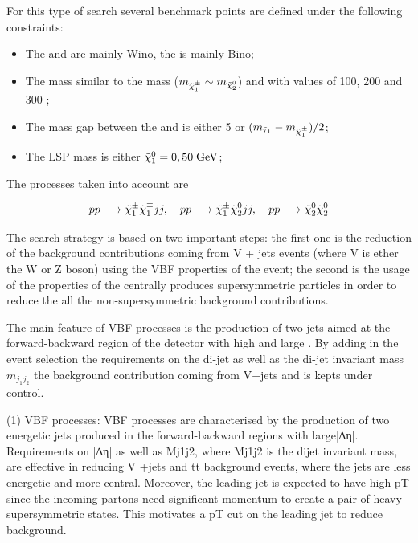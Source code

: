 For this type of search several benchmark points are defined under the following constraints:
\begin{itemize}
	\item The \charginopm and \neutralinotwo are mainly Wino, the \neutralinoone is mainly Bino;
	\item The \charginomp mass similar to the \neutralinotwo mass ($m_{\tilde{\chi}^{\pm}_{1}} \sim m_{\tilde{\chi}^{0}_{2}}$) and with values of 100, 200 and 300 \gev;
	\item The mass gap between the \stau and \charginopm is either 5 \gev or $(m_{\tilde{\tau}_{1}} - m_{\tilde{\chi}^{\pm}_{1}})/2$;
	\item The LSP mass is either $\tilde{\chi}^{0}_{1} = 0 , 50 \;\text{Ge}\kern-0.06667em\text{V}$;
\end{itemize}

The processes taken into account are

\begin{equation}
pp \longrightarrow \tilde{\chi}^{\pm}_{1} \tilde{\chi}^{\mp}_{1} jj, \quad pp \longrightarrow \tilde{\chi}^{\pm}_{1} \tilde{\chi}^{0}_{2} jj, \quad pp \longrightarrow \tilde{\chi}^{0}_{2} \tilde{\chi}^{0}_{2}
\end{equation}


The search strategy is based on two important steps: the first one is the reduction of the background contributions coming from V + jets events (where V is ether the W or Z boson) using the VBF properties of the event; the second is the usage of the properties of the centrally produces supersymmetric particles in order to reduce the all the non-supersymmetric background contributions.

The main feature of VBF processes is the production of two jets aimed at the forward-backward region of the detector with high \pt and large \deltaeta. By adding in the event selection the requirements on the di-jet \deltaeta as well as the di-jet invariant mass \ensuremath{m_{j_{1}j_{2}}} the background contribution coming from V+jets and \ttbar is kepts under control. 

(1) VBF processes: VBF processes are characterised by the production of two energetic jets produced in the forward-backward regions with large|∆η|. Requirements on |∆η| as well as Mj1j2, where Mj1j2 is the dijet invariant mass, are eﬀective in reducing V +jets and tt background events, where the jets are less energetic and more central. Moreover, the leading jet is expected to have high pT since the incoming partons need signiﬁcant momentum to create a pair of heavy supersymmetric states. This motivates a pT cut on the leading jet to reduce background.


